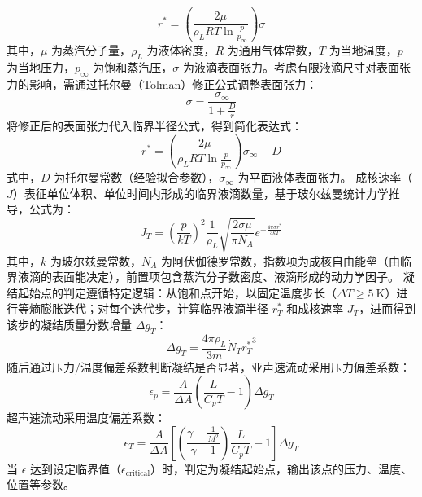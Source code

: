 \begin{equation}
	r^* = \left( \frac{2\mu}{\rho_L RT \ln \frac{p}{p_\infty}} \right) \sigma
\end{equation}
其中，\(\mu\) 为蒸汽分子量，\(\rho_L\) 为液体密度，\(R\) 为通用气体常数，\(T\) 为当地温度，\(p\) 为当地压力，\(p_\infty\) 为饱和蒸汽压，\(\sigma\) 为液滴表面张力。考虑有限液滴尺寸对表面张力的影响，需通过托尔曼（Tolman）修正公式调整表面张力：
\begin{equation}
	\sigma = \frac{\sigma_\infty}{1 + \frac{D}{r}}
\end{equation}
将修正后的表面张力代入临界半径公式，得到简化表达式：
\begin{equation}
	r^* = \left( \frac{2\mu}{\rho_L RT \ln \frac{p}{p_\infty}} \right) \sigma_\infty - D
\end{equation}
式中，\(D\) 为托尔曼常数（经验拟合参数），\(\sigma_\infty\) 为平面液体表面张力。
成核速率（\(J\)）表征单位体积、单位时间内形成的临界液滴数量，基于玻尔兹曼统计力学推导，公式为：
\begin{equation}
	J_T = \left( \frac{p}{kT} \right)^2 \frac{1}{\rho_L} \sqrt{\frac{2\sigma \mu}{\pi N_A}} e^{-\frac{4\pi \sigma r^*}{3kT}}
\end{equation}
其中，\(k\) 为玻尔兹曼常数，\(N_A\) 为阿伏伽德罗常数，指数项为成核自由能垒（由临界液滴的表面能决定），前置项包含蒸汽分子数密度、液滴形成的动力学因子。
凝结起始点的判定遵循特定逻辑：从饱和点开始，以固定温度步长（\(\Delta T \geq 5\ \text{K}\)）进行等熵膨胀迭代；对每个迭代步，计算临界液滴半径 \(r_T^*\) 和成核速率 \(J_T\)，进而得到该步的凝结质量分数增量 \(\Delta g_T\)：
\begin{equation}
	\Delta g_T = \frac{4\pi \rho_L}{3\dot{m}} \dot{N}_T {r_T^*}^3
\end{equation}
随后通过压力/温度偏差系数判断凝结是否显著，亚声速流动采用压力偏差系数：
\begin{equation}
	\epsilon_p = \frac{A}{\Delta A} \left( \frac{L}{C_p T} - 1 \right) \Delta g_T
\end{equation}
超声速流动采用温度偏差系数：
\begin{equation}
	\epsilon_T = \frac{A}{\Delta A} \left[ \left( \frac{\gamma - \frac{1}{M^2}}{\gamma - 1} \right) \frac{L}{C_p T} - 1 \right] \Delta g_T
\end{equation}
当 \(\epsilon\) 达到设定临界值（\(\epsilon_{\text{critical}}\)）时，判定为凝结起始点，输出该点的压力、温度、位置等参数。
